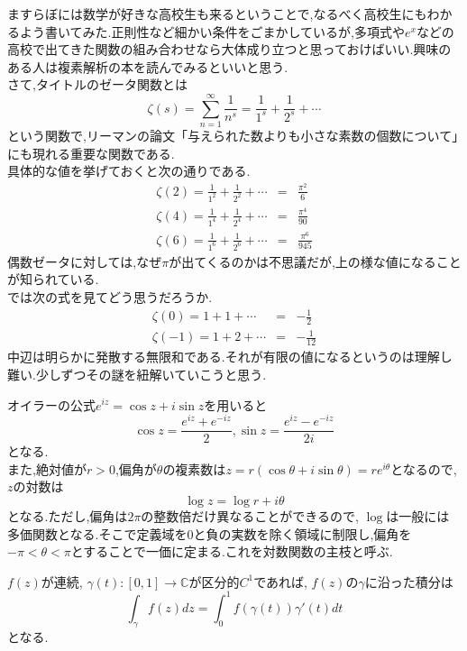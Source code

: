 ますらぼには数学が好きな高校生も来るということで,なるべく高校生にもわかるよう書いてみた.正則性など細かい条件をごまかしているが,多項式や$e^x$などの高校で出てきた関数の組み合わせなら大体成り立つと思っておけばいい.興味のある人は複素解析の本を読んでみるといいと思う.\\
さて,タイトルのゼータ関数とは
\[
\zeta(s)=\sum_{n=1}^\infty\frac{1}{n^s}=\frac{1}{1^s}+\frac{1}{2^s}+\cdots
\]
という関数で,リーマンの論文「与えられた数よりも小さな素数の個数について」\cite{Riemann}にも現れる重要な関数である.\\
具体的な値を挙げておくと次の通りである.
\begin{eqnarray*}
\zeta(2)=\frac{1}{1^2}+\frac{1}{2^2}+\cdots &=& \frac{\pi^2}{6}\\
\zeta(4)=\frac{1}{1^4}+\frac{1}{2^4}+\cdots &=& \frac{\pi^4}{90}\\
\zeta(6)=\frac{1}{1^6}+\frac{1}{2^6}+\cdots &=& \frac{\pi^6}{945}
\end{eqnarray*}
偶数ゼータに対しては,なぜ$\pi$が出てくるのかは不思議だが,上の様な値になることが知られている.\\
では次の式を見てどう思うだろうか.
\begin{eqnarray*}
\zeta(0)=1+1+\cdots &=& -\frac{1}{2}\\
\zeta(-1)=1+2+\cdots &=& -\frac{1}{12}
\end{eqnarray*}
中辺は明らかに発散する無限和である.それが有限の値になるというのは理解し難い.少しずつその謎を紐解いていこうと思う.

オイラーの公式$e^{iz}=\cos z+i\sin z$を用いると
\[
\cos z=\frac{e^{iz}+e^{-iz}}{2}, \sin z=\frac{e^{iz}-e^{-iz}}{2i}
\]
となる.\\
また,絶対値が$r>0$,偏角が$\theta$の複素数は$z=r(\cos\theta+i\sin\theta)=re^{i\theta}$となるので, $z$の対数は
\[
\log z=\log r +i\theta
\]
となる.ただし,偏角は$2\pi$の整数倍だけ異なることができるので, $\log$は一般には多価関数となる.そこで定義域を0と負の実数を除く領域に制限し,偏角を$-\pi<\theta<\pi$とすることで一価に定まる.これを対数関数の主枝と呼ぶ.

$f(z)$が連続, $\gamma(t)\colon[0,1]\to\mathbb{C}$が区分的$C^1$であれば, $f(z)$の$\gamma$に沿った積分は
\[
\int_\gamma f(z)dz = \int_0^1 f(\gamma(t))\gamma'(t)dt
\]
となる.\\

